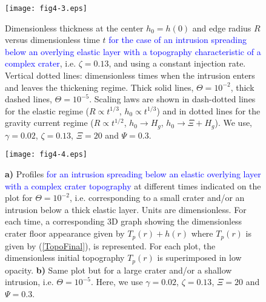 \begin{article}
\begin{figure}[pb]
\graphicspath{{/Users/thorey/Documents/These/Submission/Article/FFC_JGR_2013/Paper_APRES_2nd_REVIEW/}}
  \centering
  \noindent\texttt{[image: fig4-3.eps]}
  \caption{Dimensionless thickness  at the center $h_0=h(0)$  and edge
    radius $R$ versus dimensionless  time $t$ \textcolor{blue}{for the
      case of an intrusion spreading  below an overlying elastic layer
      with  a   topography  characteristic   of  a   complex  crater},
    i.e. $\zeta=0.13$,  and using a constant  injection rate. Vertical
    dotted lines:  dimensionless times  when the intrusion  enters and
    leaves the thickening regime. Thick solid lines, $\Theta=10^{-2}$,
    thick dashed  lines, $\Theta=10^{-5}$.  Scaling laws are  shown in
    dash-dotted  lines for  the  elastic  regime ($R\propto  t^{1/3}$,
    $h_0\propto t ^{1/3}$) and in dotted lines for the gravity current
    regime    ($R\propto    t^{1/2}$,     $h_0    \rightarrow    H_g$,
    $h_0 \rightarrow \Xi+ H_g$).  We use, $\gamma=0.02$, $\zeta=0.13$,
    $\Xi=20$ and $\Psi=0.3$.}
  \label{fig4-3}
\end{figure}


\begin{figure}[pb]
\graphicspath{{/Users/thorey/Documents/These/Submission/Article/FFC_JGR_2013/Paper_APRES_2nd_REVIEW/}}
  \centering
  \noindent\texttt{[image: fig4-4.eps]}
  \caption{  \textbf{a) }  Profiles \textcolor{blue}{for  an intrusion
      spreading below an elastic overlying layer with a complex crater
      topography}  at  different  times  indicated  on  the  plot  for
    $\Theta=10^{-2}$, i.e.  corresponding to a small  crater and/or an
    intrusion    below   a    thick   elastic    layer.   Units    are
    dimensionless. For each time, a corresponding 3D graph showing the
    dimensionless crater floor appearance given by $T_p(r)+h(r)$ where
    $T_p(r)$ is  given by (\ref{TopoFinal}), is  represented. For each
    plot,   the   dimensionless   initial   topography   $T_p(r)$   is
    superimposed in low opacity. \textbf{b)} Same plot but for a large
    crater and/or a shallow intrusion, i.e. $\Theta=10^{-5}$. Here, we
    use $\gamma=0.02$, $\zeta=0.13$, $\Xi=20$ and $\Psi=0.3$.}
  \label{fig4-4}
\end{figure}


\end{article}
